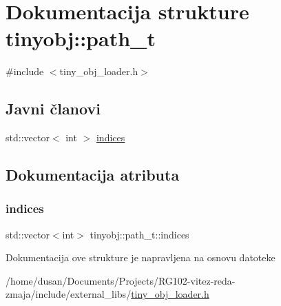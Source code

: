\hypertarget{structtinyobj_1_1path__t}{}\section{Dokumentacija strukture tinyobj\+:\+:path\+\_\+t}
\label{structtinyobj_1_1path__t}


{\ttfamily \#include $<$tiny\+\_\+obj\+\_\+loader.\+h$>$}

\subsection*{Javni članovi}
\begin{DoxyCompactItemize}
\item 
std\+::vector$<$ int $>$ \hyperlink{structtinyobj_1_1path__t_ab6ce1d658025985d26ad90d88ff91a60}{indices}
\end{DoxyCompactItemize}


\subsection{Dokumentacija atributa}
\mbox{\label{structtinyobj_1_1path__t_ab6ce1d658025985d26ad90d88ff91a60}} 
\subsubsection{\texorpdfstring{indices}{indices}}
{\footnotesize\ttfamily std\+::vector$<$int$>$ tinyobj\+::path\+\_\+t\+::indices}



Dokumentacija ove strukture je napravljena na osnovu datoteke \begin{DoxyCompactItemize}
\item 
/home/dusan/\+Documents/\+Projects/\+R\+G102-\/vitez-\/reda-\/zmaja/include/external\+\_\+libs/\hyperlink{tiny__obj__loader_8h}{tiny\+\_\+obj\+\_\+loader.\+h}\end{DoxyCompactItemize}
